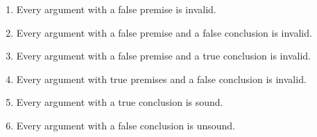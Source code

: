 \documentclass{article}
\begin{document}
\begin{enumerate}
\begin{enumerate}
 \item Every argument with a false premise is invalid.
 \vspace{1.1in}
 
 \item Every argument with a false premise and a false conclusion is invalid.
 \vspace{1.1 in}
 
  \item Every argument with a false premise and a true conclusion is invalid.
 \vspace{1.1 in}

 \item Every argument with true premises and a false conclusion is invalid.
 \vspace{1.1 in}

 \item Every argument with a true conclusion is sound.
 \vspace{1.1 in}
 
  \item Every argument with a false conclusion is unsound.
 \vspace{.5 in}
\end{enumerate}
\end{enumerate}
\end{document}
